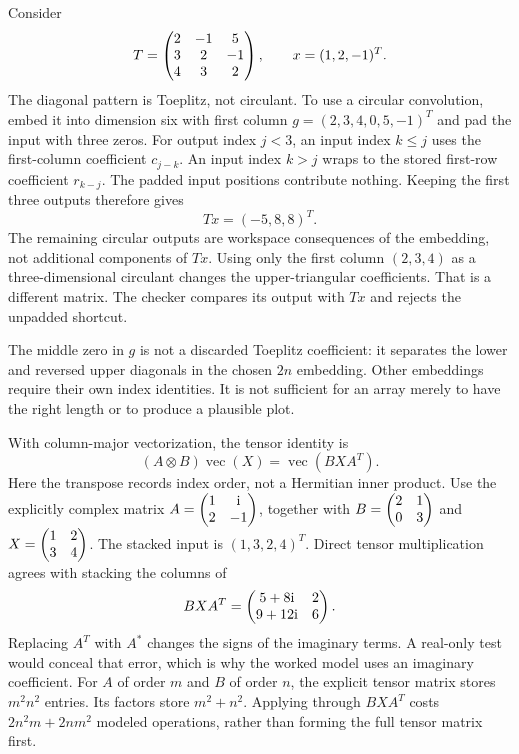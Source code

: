 Consider
\[
T=\begin{pmatrix}2&-1&5\\3&2&-1\\4&3&2\end{pmatrix},\qquad x=(1,2,-1)^T.
\]
The diagonal pattern is Toeplitz, not circulant. To use a circular convolution, embed it into dimension six with first column $g=(2,3,4,0,5,-1)^T$ and pad the input with three zeros.
For output index $j<3$, an input index $k\le j$ uses the first-column coefficient $c_{j-k}$. An input index $k>j$ wraps to the stored first-row coefficient $r_{k-j}$. The padded input positions contribute nothing. Keeping the first three outputs therefore gives
\[
Tx=(-5,8,8)^T.
\]
The remaining circular outputs are workspace consequences of the embedding, not additional components of $Tx$.
Using only the first column $(2,3,4)$ as a three-dimensional circulant changes the upper-triangular coefficients. That is a different matrix. The checker compares its output with $Tx$ and rejects the unpadded shortcut.

The middle zero in $g$ is not a discarded Toeplitz coefficient: it separates the lower and reversed upper diagonals in the chosen $2n$ embedding. Other embeddings require their own index identities. It is not sufficient for an array merely to have the right length or to produce a plausible plot.

With column-major vectorization, the tensor identity is
\[
(A\otimes B)\operatorname{vec}(X)=\operatorname{vec}(BXA^T).
\]
Here the transpose records index order, not a Hermitian inner product. Use the explicitly complex matrix $A=\begin{pmatrix}1&\mathrm i\\2&-1\end{pmatrix}$, together with $B=\begin{pmatrix}2&1\\0&3\end{pmatrix}$ and $X=\begin{pmatrix}1&2\\3&4\end{pmatrix}$.
The stacked input is $(1,3,2,4)^T$. Direct tensor multiplication agrees with stacking the columns of
\[
BXA^T=\begin{pmatrix}5+8\mathrm i&2\\9+12\mathrm i&6\end{pmatrix}.
\]
Replacing $A^T$ with $A^*$ changes the signs of the imaginary terms. A real-only test would conceal that error, which is why the worked model uses an imaginary coefficient.
For $A$ of order $m$ and $B$ of order $n$, the explicit tensor matrix stores $m^2n^2$ entries. Its factors store $m^2+n^2$. Applying through $BXA^T$ costs $2n^2m+2nm^2$ modeled operations, rather than forming the full tensor matrix first.

